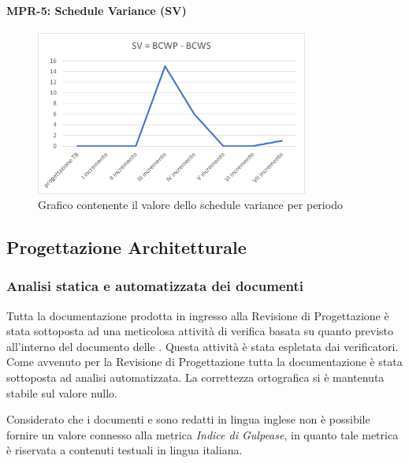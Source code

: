 \paragraph{MPR-5: Schedule Variance (SV)}\label{_SV}
\begin{figure}[!htb]
    \centering
    \includegraphics[width=0.8\textwidth]{res/images/metriche_costi/SV.png}
    \caption{Grafico contenente il valore dello schedule variance per periodo}
\end{figure} 


\newpage
\subsection{Progettazione Architetturale} 

\subsubsection{Analisi statica e automatizzata dei documenti}\label{resocontoProgettazioneArchitetturale}
Tutta la documentazione prodotta in ingresso alla Revisione di Progettazione è stata sottoposta ad una meticolosa attività di verifica
basata su quanto previsto all'interno del documento delle .
Questa attività è stata espletata dai verificatori.
Come avvenuto per la Revisione di Progettazione tutta la documentazione è stata sottoposta ad analisi automatizzata.
La correttezza ortografica si è mantenuta stabile sul valore nullo.

Considerato che i documenti  e   sono redatti in lingua inglese
non è possibile fornire un valore connesso alla metrica \textit{Indice di Gulpease}, in quanto tale metrica è riservata a contenuti 
testuali in lingua italiana.



